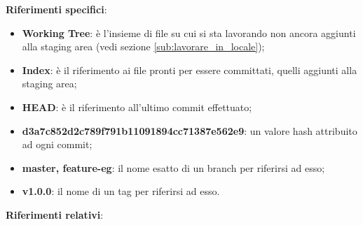 \textbf{Riferimenti specifici}:
	\begin{itemize}
		\item \textbf{Working Tree}: è l'insieme di file su cui si sta lavorando non ancora aggiunti alla staging area (vedi sezione \ref{sub:lavorare_in_locale});
		\item \textbf{Index}: è il riferimento ai file pronti per essere committati, quelli aggiunti alla staging area;
		\item \textbf{HEAD}: è il riferimento all'ultimo commit effettuato;
		\item \textbf{d3a7c852d2c789f791b11091894cc71387e562e9}: un valore hash attribuito ad ogni commit;
		\item \textbf{master, feature-eg}: il nome esatto di un branch per riferirsi ad esso;
		\item \textbf{v1.0.0}: il nome di un tag per riferirsi ad esso.
	\end{itemize}
	\noindent
\textbf{Riferimenti relativi}:

\newpage \clearpage
